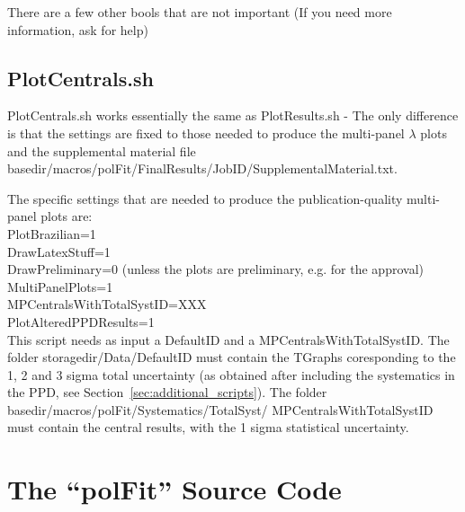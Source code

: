 \documentclass{article}
\begin{document}
There are a few other bools that are not important (If you need more information, ask for help)

\subsection*{PlotCentrals.sh}

PlotCentrals.sh works essentially the same as PlotResults.sh - The only difference is that the settings are fixed to those needed to produce the multi-panel $\lambda$ plots and the supplemental material file basedir/macros/polFit/FinalResults/JobID/SupplementalMaterial.txt.

The specific settings that are needed to produce the publication-quality multi-panel plots are:
\\PlotBrazilian=1
\\DrawLatexStuff=1
\\DrawPreliminary=0 (unless the plots are preliminary, e.g. for the approval)
\\MultiPanelPlots=1
\\MPCentralsWithTotalSystID=XXX
\\PlotAlteredPPDResults=1
\\
This script needs as input a DefaultID and a MPCentralsWithTotalSystID. The folder storagedir/Data/DefaultID must contain the TGraphs coresponding to the 1, 2 and 3 sigma total uncertainty (as obtained after including the systematics in the PPD, see Section~\ref{sec:additional_scripts}). The folder basedir/macros/polFit/Systematics/TotalSyst/ MPCentralsWithTotalSystID must contain the central results, with the 1 sigma statistical uncertainty.

\section{The ``polFit'' Source Code}
\end{document}
